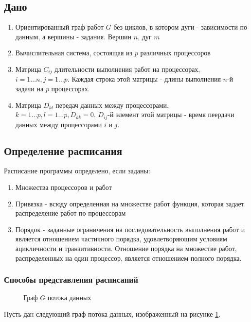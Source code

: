 \subsection{Дано}
\begin{enumerate}
    \item Ориентированный граф работ $G$ без циклов, в котором дуги - зависимости по данным, а вершины - задания. Вершин $n$, дуг $m$
    \item Вычислительная система, состоящая из $p$ различных процессоров
    \item Матрица $C_{ij}$ длительности выполнения работ на процессорах, $i=1 \dots n, j=1 \dots p$. Каждая строка этой матрицы - длины выполнения $n$-й задачи на $p$ процессорах. 
    \item Матрица $D_{kl}$ передач данных между процессорами, $k=1 \dots p, l = 1 \dots p, D_{kk} = 0$. $D_{ij}$-й элемент этой матрицы - время пеердачи данных между процессорами $i$ и $j$.
\end{enumerate}
\subsection{Определение расписания}
Расписание программы определено, если заданы:
\begin{enumerate}
    \item Множества процессоров и работ
    \item Привязка - всюду определенная на множестве работ функция, которая задает распределение работ по процессорам
    \item Порядок - заданные ограничения на последовательность выполнения работ и является отношением частичного порядка, удовлетворяющим условиям ацикличности и транзитивности. Отношение порядка на множестве работ, распределенных на один процессор, является отношением полного порядка.
\end{enumerate}
\subsubsection{Способы представления расписаний}
\begin{figure}[!htbp]
    \caption{Граф $G$ потока данных}
    \label{fig:DFG}
\end{figure}
Пусть дан следующий граф потока данных, изображенный на рисунке \ref{fig:DFG}.

